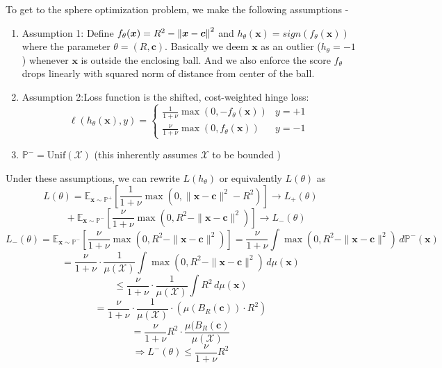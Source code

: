 \documentclass[11pt]{report}
\begin{document}
To get to the sphere optimization problem, we make the following assumptions - 
\begin{enumerate}
    \item Assumption 1: Define $f_\theta(\boldsymbol{x}) = R^2 - \left\lVert \boldsymbol{x} - \boldsymbol{c} \right\rVert^2$ and $h_\theta(\boldsymbol{x}) = sign(f_\theta(\boldsymbol{x}))$ where the parameter $\theta = (R, \boldsymbol{c})$.  Basically we deem $\boldsymbol{x}$ as an outlier ($h_\theta = -1$) whenever $\boldsymbol{x}$ is outside the enclosing ball. And we also enforce the score $f_\theta$ drops linearly with squared norm of distance from center of the ball. 
    \item Assumption 2:Loss function is the shifted, cost-weighted hinge loss:
        \[
        \ell(h_\theta(\boldsymbol{x}), y) = 
        \begin{cases}
        \frac{1}{1 + \nu} \max(0, -f_\theta(\boldsymbol{x})) & y = +1 \\
        \frac{\nu}{1 + \nu} \max(0, f_\theta(\boldsymbol{x})) & y = -1
        \end{cases}
        \]
    \item $\mathbb{P}^- = \text{Unif}(\mathcal{X})$ (this inherently assumes $\mathcal{X}$ to be bounded )
\end{enumerate}
Under these assumptions, we can rewrite $L(h_\theta)$ or equivalently $L(\theta)$ as 
\[
L(\theta) = \mathbb{E}_{\boldsymbol{x} \sim \mathbb{P}^+} \left[ \frac{1}{1 + \nu} \max\left(0, \|\boldsymbol{x} - \boldsymbol{c}\|^2 - R^2\right) \right] 
\rightarrow L_+(\theta)
\]
\[
\quad + \mathbb{E}_{\boldsymbol{x} \sim \mathbb{P}^-} \left[ \frac{\nu}{1 + \nu} \max\left(0, R^2 - \|\boldsymbol{x} - \boldsymbol{c}\|^2 \right) \right] 
\rightarrow L_-(\theta)
\]
\[ L_{-}(\theta) = 
\mathbb{E}_{\boldsymbol{x} \sim \mathbb{P}^-} \left[ \frac{\nu}{1+\nu} \max(0, R^2 - \|\boldsymbol{x} - \boldsymbol{c}\|^2) \right]
= \frac{\nu}{1+\nu} \int \max(0, R^2 - \|\boldsymbol{x} - \boldsymbol{c}\|^2) \, d\mathbb{P}^-(\boldsymbol{x})
\]
\[
= \frac{\nu}{1+\nu} \cdot \frac{1}{\mu(\mathcal{X})} \int \max(0, R^2 - \|\boldsymbol{x} - \boldsymbol{c}\|^2) \, d\mu(\boldsymbol{x})
\]
\[
\leq \frac{\nu}{1+\nu} \cdot \frac{1}{\mu(\mathcal{X})} \int R^2 \, d\mu(\boldsymbol{x})
\]
\[
= \frac{\nu}{1+\nu} \cdot \frac{1}{\mu(\mathcal{X})} \cdot \left( \mu(B_R(\boldsymbol{c})) \cdot R^2 \right)
\]
\[
= \frac{\nu}{1+\nu} R^2 \cdot \frac{\mu(B_R(\boldsymbol{c})}{\mu(\mathcal{X})}
\]
\[
\Rightarrow L^-(\theta) \leq \frac{\nu}{1+\nu} R^2
\]
\end{document}
